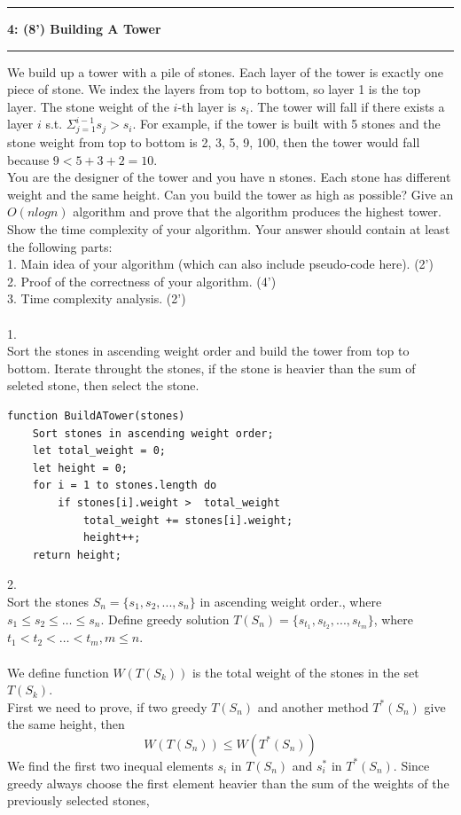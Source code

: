 \documentclass[10.5pt]{article}
\newcommand\question[2]{\vspace{.25in}\hrule\textbf{#1: #2}\vspace{.5em}\hrule\vspace{.10in}}
\begin{document}
\pagebreak
\newpage
\question{4}{(8') Building A Tower}
We build up a tower with a pile of stones. Each layer of the tower is exactly one
piece of stone. We index the layers from top to bottom, so layer 1 is the top
layer. The stone weight of the $i$-th layer is $s_i$. The tower will fall if there exists
a layer $i$ s.t. $\Sigma_{j=1} ^{i-1} s_j > s_i$. For example, if the tower is built with 5 stones and the stone weight from top to bottom is 2, 3, 5, 9, 100, then the tower would fall because $9 < 5 + 3 + 2 = 10$. \\
You are the designer of the tower and you have n stones. Each stone has different weight and the same height. Can you build the tower as high as possible?  Give an $O(nlogn)$ algorithm and prove that the algorithm produces the highest tower. Show the time complexity of your algorithm. Your answer should contain at least the following parts: \\
1. Main idea of your algorithm (which can also include pseudo-code here). (2')\\
2. Proof of the correctness of your algorithm. (4')\\
3. Time complexity analysis. (2')\\
\\
1.\\
Sort the stones in ascending weight order and build the tower from top to bottom. Iterate throught the stones, if the stone is heavier than the sum of seleted stone, then select the stone.\\
\begin{lstlisting}
function BuildATower(stones)
	Sort stones in ascending weight order;
	let total_weight = 0;
	let height = 0;
	for i = 1 to stones.length do
		if stones[i].weight >  total_weight
			total_weight += stones[i].weight;
			height++;
	return height;
\end{lstlisting}
2.\\
Sort the stones $S_n = \{s_1, s_2, ..., s_n\}$ in ascending weight order., where $s_1\le s_2\le \dots\le s_n$. Define greedy solution $T(S_n) = \{s_{t_1}, s_{t_2}, ..., s_{t_m}\}$, where $t_1 < t_2 < \dots < t_m, m\le n$.\\
\\We define function $W(T(S_k))$ is the total weight of the stones in the set $T(S_k)$.\\
First we need to prove, if two greedy $T(S_n)$ and another method $T^*(S_n)$ give the same height, then
$$
	W(T(S_n)) \le W(T^*(S_n))
$$
We find the first two inequal elements $s_i$ in $T(S_n)$ and $s^*_i$ in $T^*(S_n)$. Since greedy always choose the first element heavier than the sum of the weights of the previously selected stones,
\end{document}
